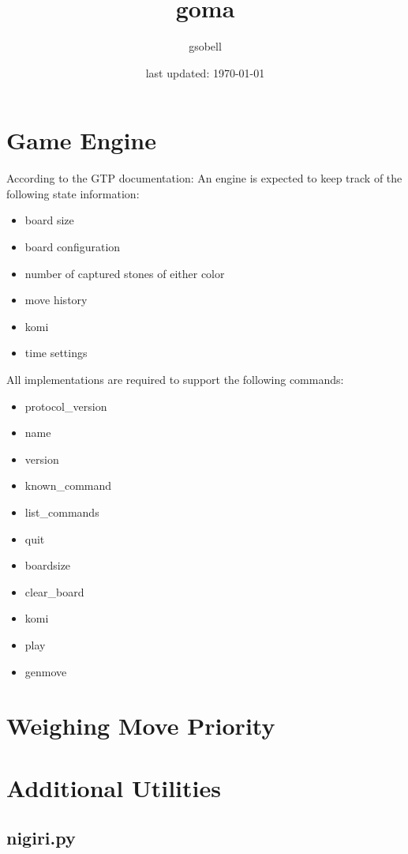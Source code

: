 \documentclass[11pt]{article}
\title{\textbf{goma}}
\author{gsobell}
\date{last updated: \today}
\begin{document}
\maketitle
{}

\section{Game Engine}
According to the GTP documentation:
An engine is expected to keep track of the following state information:

\begin{itemize}
\item board size
\item board configuration
\item number of captured stones of either color
\item move history
\item komi
\item time settings
\end{itemize}
All implementations are required to support the following commands:

\begin{itemize}
\item protocol\_version
\item name
\item version
\item known\_command
\item list\_commands
\item quit
\item boardsize
\item clear\_board
\item komi
\item play
\item genmove
\end{itemize}


\section{Weighing Move Priority}

\section{Additional Utilities}
\subsection{nigiri.py}
\end{document}
